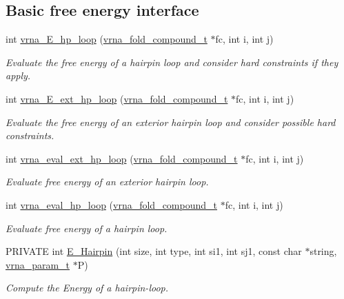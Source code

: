 \subsection*{Basic free energy interface}
\begin{DoxyCompactItemize}
\item 
int \hyperlink{group__eval__loops__hp_ga57179ea326cc5ed8dfe4d3962b233128}{vrna\+\_\+\+E\+\_\+hp\+\_\+loop} (\hyperlink{group__fold__compound_ga1b0cef17fd40466cef5968eaeeff6166}{vrna\+\_\+fold\+\_\+compound\+\_\+t} $\ast$fc, int i, int j)
\begin{DoxyCompactList}\small\item\em Evaluate the free energy of a hairpin loop and consider hard constraints if they apply. \end{DoxyCompactList}\item 
int \hyperlink{group__eval__loops__hp_ga7d358fa17aaf1cfc312a053accd10778}{vrna\+\_\+\+E\+\_\+ext\+\_\+hp\+\_\+loop} (\hyperlink{group__fold__compound_ga1b0cef17fd40466cef5968eaeeff6166}{vrna\+\_\+fold\+\_\+compound\+\_\+t} $\ast$fc, int i, int j)
\begin{DoxyCompactList}\small\item\em Evaluate the free energy of an exterior hairpin loop and consider possible hard constraints. \end{DoxyCompactList}\item 
\mbox{\label{group__eval__loops__hp_gafd39e7355dcf36bf1517bafc1b49c2d2}} 
int \hyperlink{group__eval__loops__hp_gafd39e7355dcf36bf1517bafc1b49c2d2}{vrna\+\_\+eval\+\_\+ext\+\_\+hp\+\_\+loop} (\hyperlink{group__fold__compound_ga1b0cef17fd40466cef5968eaeeff6166}{vrna\+\_\+fold\+\_\+compound\+\_\+t} $\ast$fc, int i, int j)
\begin{DoxyCompactList}\small\item\em Evaluate free energy of an exterior hairpin loop. \end{DoxyCompactList}\item 
int \hyperlink{group__eval__loops__hp_gad0bb844f8dc704c71737ae1d7e32b975}{vrna\+\_\+eval\+\_\+hp\+\_\+loop} (\hyperlink{group__fold__compound_ga1b0cef17fd40466cef5968eaeeff6166}{vrna\+\_\+fold\+\_\+compound\+\_\+t} $\ast$fc, int i, int j)
\begin{DoxyCompactList}\small\item\em Evaluate free energy of a hairpin loop. \end{DoxyCompactList}\item 
P\+R\+I\+V\+A\+TE int \hyperlink{group__eval__loops__hp_gadf943ee9a45b7f4cee9192c06210dace}{E\+\_\+\+Hairpin} (int size, int type, int si1, int sj1, const char $\ast$string, \hyperlink{group__energy__parameters_ga8a69ca7d787e4fd6079914f5343a1f35}{vrna\+\_\+param\+\_\+t} $\ast$P)
\begin{DoxyCompactList}\small\item\em Compute the Energy of a hairpin-\/loop. \end{DoxyCompactList}\end{DoxyCompactItemize}
